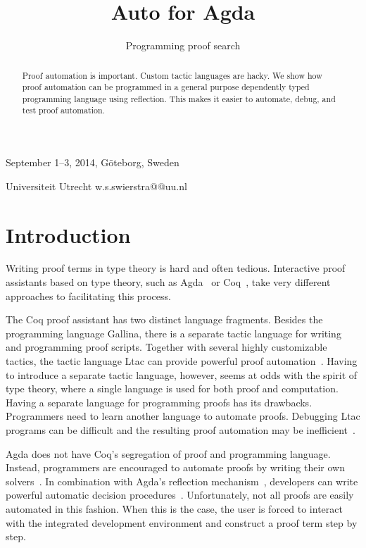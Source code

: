 \documentclass[preprint]{sigplanconf}
\begin{document}
 {September 1--3, 2014, G\"oteborg, Sweden}

\title{Auto for Agda}
\subtitle{Programming proof search}

           {Universiteit Utrecht}
           { \quad w.s.swierstra@@uu.nl}

\maketitle



\begin{abstract}
Proof automation is important. Custom tactic languages are hacky. We
show how proof automation can be programmed in a general purpose
dependently typed programming language using reflection. This makes
it easier to automate, debug, and test proof automation.
\end{abstract}



\section{Introduction}
\label{sec:intro}

Writing proof terms in type theory is hard and often tedious.
Interactive proof assistants based on type theory, such as
Agda~\cite{agda} or Coq~\cite{coq}, take
very different approaches to facilitating this process.

The Coq proof assistant has two distinct language fragments. Besides the
programming language Gallina, there is a separate tactic language for
writing and programming proof scripts. Together with several highly
customizable tactics, the tactic language Ltac can provide powerful
proof automation~\cite{chlipala}. Having to introduce a
separate tactic language, however, seems at odds with the spirit of type
theory, where a single language is used for both proof and computation.
Having a separate language for programming proofs has its
drawbacks. Programmers need to learn another language to automate
proofs. Debugging Ltac programs can be difficult and the resulting
proof automation may be inefficient~\cite{brabaint}.


Agda does not have Coq's segregation of proof and programming language.
Instead, programmers are encouraged to automate proofs by writing their
own solvers~\cite{ulf-tphols}. In combination with
Agda's reflection mechanism~\cite{van-der-walt},
developers can write powerful automatic decision
procedures~\cite{allais}. Unfortunately, not all proofs
are easily automated in this fashion. When this is the case, the user is
forced to interact with the integrated development environment and
construct a proof term step by step.
\end{document}

